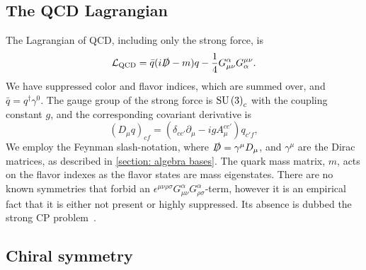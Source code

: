 \subsection{The QCD Lagrangian}

The Lagrangian of QCD, including only the strong force, is
%
\begin{equation}
    \mathcal{L}_{\text{QCD}} 
    = \bar q (i \slashed D - m)q - \frac{1}{4} G_{\mu \nu}^\alpha G^{\mu \nu}_\alpha.
\end{equation}
%
We have suppressed color and flavor indices, which are summed over, and $\bar q = q^\dagger \gamma^0$.
The gauge group of the strong force is $\text{SU}\left(3\right)_c$ with the coupling constant $g$, and the corresponding covariant derivative is
%
\begin{equation}
    (D_\mu q)_{cf} =  (\delta_{cc'} \partial_\mu - i g A_\mu^{cc'}) q_{c'f},
\end{equation}
%
We employ the Feynman slash-notation, where $\slashed D = \gamma^\mu D_\mu$, and $\gamma^\mu$ are the Dirac matrices, as described in \autoref{section: algebra bases}.
The quark mass matrix, $m$, acts on the flavor indexes as the flavor states are mass eigenstates.
There are no known symmetries that forbid an $\epsilon^{\mu \nu \rho \sigma} G_{\mu \nu}^\alpha G_{\rho \sigma}^\alpha$-term, however it is an empirical fact that it is either not present or highly suppressed. 
Its absence is dubbed the strong CP problem~\autocite{schwartzQuantumFieldTheory2013}.



\subsection{Chiral symmetry}
\label{subsection: chiral symmetry}

